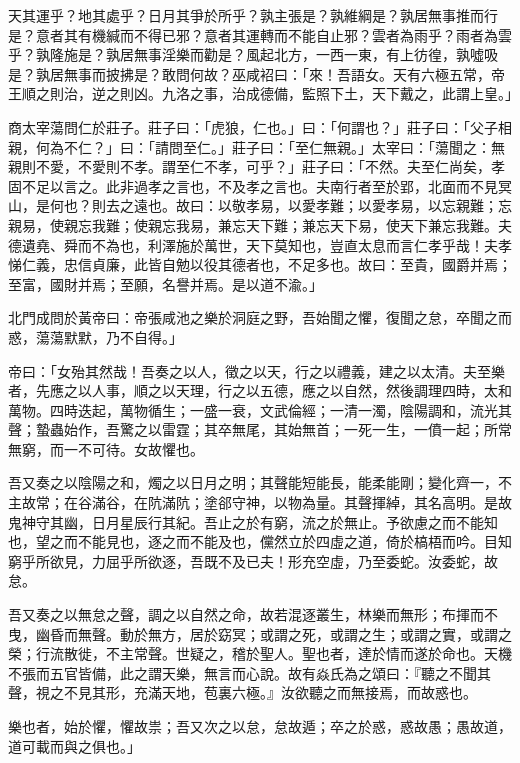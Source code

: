 
\begin{pinyinscope}
天其運乎？地其處乎？日月其爭於所乎？孰主張是？孰維綱是？孰居無事推而行是？意者其有機緘而不得已邪？意者其運轉而不能自止邪？雲者為雨乎？雨者為雲乎？孰隆施是？孰居無事淫樂而勸是？風起北方，一西一東，有上彷徨，孰噓吸是？孰居無事而披拂是？敢問何故？巫咸袑曰：「來！吾語女。天有六極五常，帝王順之則治，逆之則凶。九洛之事，治成德備，監照下土，天下戴之，此謂上皇。」

商太宰蕩問仁於莊子。莊子曰：「虎狼，仁也。」曰：「何謂也？」莊子曰：「父子相親，何為不仁？」曰：「請問至仁。」莊子曰：「至仁無親。」太宰曰：「蕩聞之：無親則不愛，不愛則不孝。謂至仁不孝，可乎？」莊子曰：「不然。夫至仁尚矣，孝固不足以言之。此非過孝之言也，不及孝之言也。夫南行者至於郢，北面而不見冥山，是何也？則去之遠也。故曰：以敬孝易，以愛孝難；以愛孝易，以忘親難；忘親易，使親忘我難；使親忘我易，兼忘天下難；兼忘天下易，使天下兼忘我難。夫德遺堯、舜而不為也，利澤施於萬世，天下莫知也，豈直太息而言仁孝乎哉！夫孝悌仁義，忠信貞廉，此皆自勉以役其德者也，不足多也。故曰：至貴，國爵并焉；至富，國財并焉；至願，名譽并焉。是以道不渝。」

北門成問於黃帝曰：帝張咸池之樂於洞庭之野，吾始聞之懼，復聞之怠，卒聞之而惑，蕩蕩默默，乃不自得。」

帝曰：「女殆其然哉！吾奏之以人，徵之以天，行之以禮義，建之以太清。夫至樂者，先應之以人事，順之以天理，行之以五德，應之以自然，然後調理四時，太和萬物。四時迭起，萬物循生；一盛一衰，文武倫經；一清一濁，陰陽調和，流光其聲；蟄蟲始作，吾驚之以雷霆；其卒無尾，其始無首；一死一生，一僨一起；所常無窮，而一不可待。女故懼也。

吾又奏之以陰陽之和，燭之以日月之明；其聲能短能長，能柔能剛；變化齊一，不主故常；在谷滿谷，在阬滿阬；塗郤守神，以物為量。其聲揮綽，其名高明。是故鬼神守其幽，日月星辰行其紀。吾止之於有窮，流之於無止。予欲慮之而不能知也，望之而不能見也，逐之而不能及也，儻然立於四虛之道，倚於槁梧而吟。目知窮乎所欲見，力屈乎所欲逐，吾既不及已夫！形充空虛，乃至委蛇。汝委蛇，故怠。

吾又奏之以無怠之聲，調之以自然之命，故若混逐叢生，林樂而無形；布揮而不曳，幽昏而無聲。動於無方，居於窈冥；或謂之死，或謂之生；或謂之實，或謂之榮；行流散徙，不主常聲。世疑之，稽於聖人。聖也者，達於情而遂於命也。天機不張而五官皆備，此之謂天樂，無言而心說。故有焱氏為之頌曰：『聽之不聞其聲，視之不見其形，充滿天地，苞裏六極。』汝欲聽之而無接焉，而故惑也。

樂也者，始於懼，懼故祟；吾又次之以怠，怠故遁；卒之於惑，惑故愚；愚故道，道可載而與之俱也。」


\end{pinyinscope}
